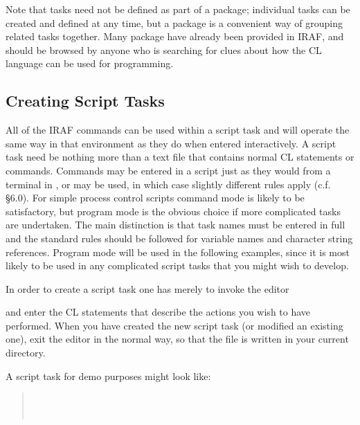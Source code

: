 Note that tasks need not be defined as part of a package; individual tasks 
can be created and defined at any time, but a package is a convenient
way of grouping related tasks together. Many package have already been
provided in IRAF, and should be browsed by anyone who is searching
for clues about how the CL language can be used for programming.

\subsection{Creating Script Tasks}

All of the IRAF commands can be used within a
script task and will operate the same way in that environment as they
do when entered interactively.  A script task need be nothing more than
a text file that contains normal CL statements or commands.
Commands may be entered in a script just as they would from a terminal
in , or  
may be used, in which case slightly different rules apply (c.f. \S 6.0).  
For simple process control scripts command mode is likely
to be satisfactory, but program mode is the obvious choice if more
complicated tasks are undertaken.  The main distinction
is that task names must be entered in full and 
the standard rules should be followed for variable names and character 
string references.  Program mode will be used in the following
examples, since it is most likely to be used in any complicated
script tasks that you might wish to develop.

In order to create a script task one has merely to invoke the editor

\begin{quotation}\noindent
{} 
\end{quotation}

\noindent
and enter the CL statements that describe the actions you wish to
have performed.  When you have created the new script task 
(or modified an existing one), exit the editor in the normal way, 
so that the file is written in your current directory.  

A script task for demo purposes might look like:

\begin{quotation}\noindent
\usertype{ \{ } \\ 
 \\
\usertype{ \} } 
\end{quotation}

